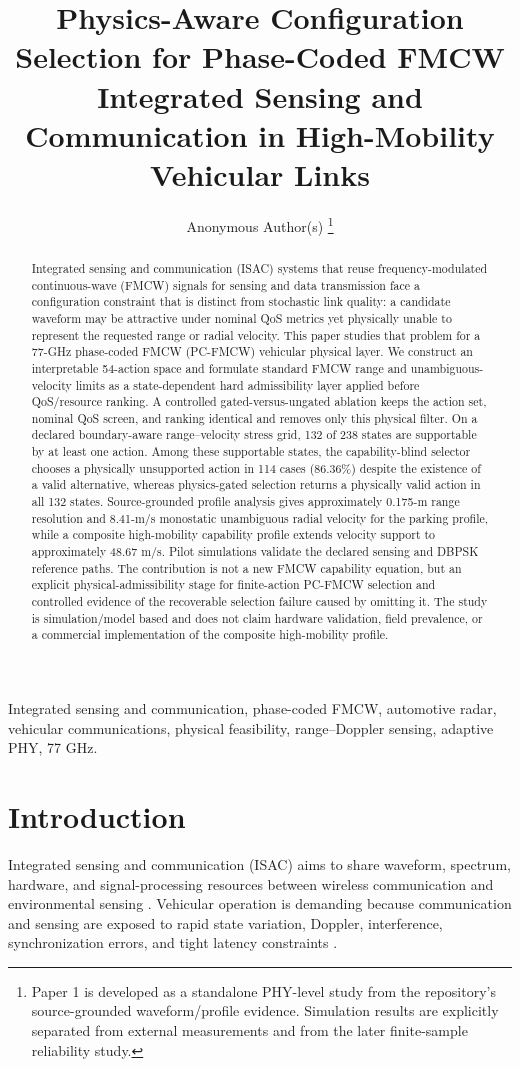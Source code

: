 \documentclass[journal]{IEEEtran}
\title{Physics-Aware Configuration Selection for Phase-Coded FMCW Integrated Sensing and Communication in High-Mobility Vehicular Links}
\author{Anonymous Author(s)%
\thanks{Paper 1 is developed as a standalone PHY-level study from the repository's source-grounded waveform/profile evidence. Simulation results are explicitly separated from external measurements and from the later finite-sample reliability study.}}
\begin{document}
\maketitle

\begin{abstract}
Integrated sensing and communication (ISAC) systems that reuse frequency-modulated continuous-wave (FMCW) signals for sensing and data transmission face a configuration constraint that is distinct from stochastic link quality: a candidate waveform may be attractive under nominal QoS metrics yet physically unable to represent the requested range or radial velocity. This paper studies that problem for a 77-GHz phase-coded FMCW (PC-FMCW) vehicular physical layer. We construct an interpretable 54-action space and formulate standard FMCW range and unambiguous-velocity limits as a state-dependent hard admissibility layer applied before QoS/resource ranking. A controlled gated-versus-ungated ablation keeps the action set, nominal QoS screen, and ranking identical and removes only this physical filter. On a declared boundary-aware range--velocity stress grid, 132 of 238 states are supportable by at least one action. Among these supportable states, the capability-blind selector chooses a physically unsupported action in 114 cases (86.36\%) despite the existence of a valid alternative, whereas physics-gated selection returns a physically valid action in all 132 states. Source-grounded profile analysis gives approximately 0.175-m range resolution and 8.41-m/s monostatic unambiguous radial velocity for the parking profile, while a composite high-mobility capability profile extends velocity support to approximately 48.67 m/s. Pilot simulations validate the declared sensing and DBPSK reference paths. The contribution is not a new FMCW capability equation, but an explicit physical-admissibility stage for finite-action PC-FMCW selection and controlled evidence of the recoverable selection failure caused by omitting it. The study is simulation/model based and does not claim hardware validation, field prevalence, or a commercial implementation of the composite high-mobility profile.
\end{abstract}

\begin{IEEEkeywords}
Integrated sensing and communication, phase-coded FMCW, automotive radar, vehicular communications, physical feasibility, range--Doppler sensing, adaptive PHY, 77 GHz.
\end{IEEEkeywords}

\section{Introduction}
Integrated sensing and communication (ISAC) aims to share waveform, spectrum, hardware, and signal-processing resources between wireless communication and environmental sensing \cite{liu2022isac,wang2022isac}. Vehicular operation is demanding because communication and sensing are exposed to rapid state variation, Doppler, interference, synchronization errors, and tight latency constraints \cite{wang2024isac,vehicular2022isac,ma2026vehicularisac}.
\end{document}
